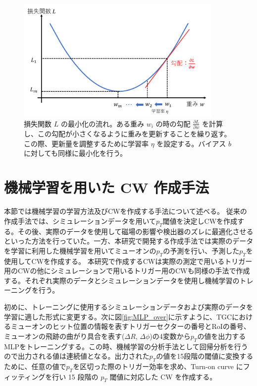\begin{figure}[tb]
  \centering
  \includegraphics[clip, width=10cm]{fig/4/lossfunc_laerning.png}
  \caption{損失関数 $L$ の最小化の流れ。ある重み $w_i$ の時の勾配 $\frac{\partial L}{\partial w}$ を計算し、この勾配が小さくなるように重みを更新することを繰り返す。この際、更新量を調整するために学習率 $\eta$ を設定する。バイアス $b$ に対しても同様に最小化を行う。}
  \label{fig:lossfunction}
\end{figure}

\section{機械学習を用いた CW 作成手法}
本節では機械学習の学習方法及びCWを作成する手法について述べる。
従来の作成手法では、シミュレーションデータを用いて$p_T$閾値を決定しCWを作成する。その後、実際のデータを使用して磁場の影響や検出器のズレに最適化させるといった方法を行っていた。一方、本研究で開発する作成手法では実際のデータを学習に利用した機械学習を用いてミューオンの$p_T$の予測を行い、予測した$p_T$を使用してCWを作成する。
本研究で作成するCWは実際の測定で用いるトリガー用のCWの他にシミュレーションで用いるトリガー用のCWも同様の手法で作成する。それぞれ実際のデータとシミュレーションデータを使用し機械学習のトレーニングを行う。

初めに、トレーニングに使用するシミュレーションデータおよび実際のデータを学習に適した形式に変更する。次に図\ref{fig:MLP_over}に示すように、TGCにおけるミューオンのヒット位置の情報を表すトリガーセクターの番号とRoIの番号、ミューオンの飛跡の曲がり具合を表す($\Delta R$, $\Delta \phi$)の4変数から$p_T$の値を出力するMLPをトレーニングする。この時、機械学習の分析手法として回帰分析を行うので出力される値は連続値となる。出力された$p_T$の値を15段階の閾値に変換するために、任意の値で$p_T$を区切った際のトリガー効率を求め、Turn-on curve にフィッティングを行い 15 段階の $p_T$ 閾値に対応した CW を作成する。

